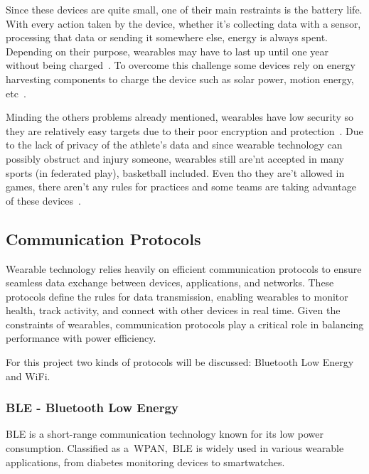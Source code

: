 Since these devices are quite small, one of their main restraints is the battery life. With every action taken by the device, whether it's collecting data with a sensor, processing that data or sending it 
somewhere else, energy is always spent. Depending on their purpose, wearables may have to last up until one year without being charged~\cite{challengesWearables}. To overcome this challenge 
some devices rely on energy harvesting components to charge the device such as solar power, motion energy, etc~\cite{embedding}.

Minding the others problems already mentioned, wearables have low security so they are relatively easy targets due to their poor encryption and protection~\cite{wearablesAndIOT}.
Due to the lack of privacy of the athlete's data and since wearable technology can possibly obstruct and injury someone, wearables still are'nt accepted in many sports 
(in federated play), basketball included. Even tho they are't allowed in games, there aren't any rules for practices and some teams are taking advantage of these 
devices~\cite{NBPAWearables, hawksWear}.


\subsection{Communication Protocols} %
\label{ssec:communication_protocols}

Wearable technology relies heavily on efficient communication protocols to ensure seamless data exchange between devices, applications, and networks. These protocols define the rules 
for data transmission, enabling wearables to monitor health, track activity, and connect with other devices in real time. Given the constraints of wearables, communication protocols 
play a critical role in balancing performance with power efficiency.

For this project two kinds of protocols will be discussed: Bluetooth Low Energy and WiFi.


\subsubsection{\gls{BLE} - Bluetooth Low Energy}
\label{sssec:bleT}

\gls{BLE} is a short-range communication technology known for its low power consumption. Classified as a~\gls{WPAN},~\gls{BLE} is widely used in 
various wearable applications, from diabetes monitoring devices to smartwatches.

